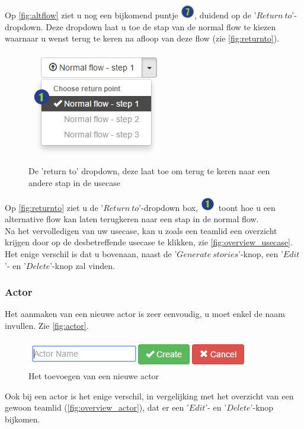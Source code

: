 \documentclass[a4paper,11pt]{article}
\newcommand{\one}{\includegraphics[scale=0.5]{Gebruikershandleiding_img/1.png}}
\newcommand{\seven}{\includegraphics[scale=0.5]{Gebruikershandleiding_img/7.png}}
\begin{document}
Op \autoref{fig:altflow} ziet u nog een bijkomend puntje \seven, duidend op de '$Return\ to$'-dropdown. Deze dropdown laat u toe de stap van de normal flow te kiezen waarnaar u wenst terug te keren na afloop van deze flow (zie \autoref{fig:returnto}).

\begin{figure}[H]
\centering
\includegraphics[scale=0.5]{Gebruikershandleiding_img/returnto.png}
\caption{De 'return to' dropdown, deze laat toe om terug te keren naar een andere stap in de usecase}
\label{fig:returnto}
\end{figure}

Op \autoref{fig:returnto} ziet u de '$Return\ to$'-dropdown box, \one\ toont hoe u een alternative flow kan laten terugkeren naar een stap in de normal flow.\\

Na het vervolledigen van uw usecase, kan u zoals een teamlid een overzicht krijgen door op de desbetreffende usecase te klikken, zie \autoref{fig:overview_usecase}. Het enige verschil is dat u bovenaan, naast de '$Generate\ stories$'-knop, een '$Edit$'- en '$Delete$'-knop zal vinden.


\subsubsection{Actor}
\label{sec:actor}
Het aanmaken van een nieuwe actor is zeer eenvoudig, u moet enkel de naam invullen. Zie \autoref{fig:actor}.\\

\begin{figure}[H]
\centering
\includegraphics[scale=0.5]{Gebruikershandleiding_img/actor.png}
\caption{Het toevoegen van een nieuwe actor}
\label{fig:actor}
\end{figure}

Ook bij een actor is het enige verschil, in vergelijking met het overzicht van een gewoon teamlid (\autoref{fig:overview_actor}), dat er een '$Edit$'- en '$Delete$'-knop bijkomen.
\end{document}
